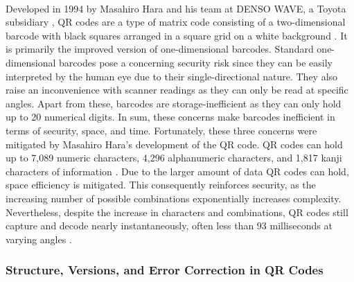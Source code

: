 \documentclass[a4paper]{scl-article}
\begin{document}
\paragraph{}Developed in 1994 by Masahiro Hara and his team at DENSO WAVE, a Toyota subsidiary \cite{densoQR}, QR codes are a type of matrix code consisting of a two-dimensional barcode with black squares arranged in a square grid on a white background \cite{worldbank2021}.  It is primarily the improved version of one-dimensional barcodes. Standard one-dimensional barcodes pose a concerning security risk since they can be easily interpreted by the human eye due to their single-directional nature. They also raise an inconvenience with scanner readings as they can only be read at specific angles. Apart from these, barcodes are storage-inefficient as they can only hold up to 20 numerical digits. In sum, these concerns make barcodes inefficient in terms of security, space, and time. Fortunately, these three concerns were mitigated by Masahiro Hara’s development of the QR code. QR codes can hold up to 7,089 numeric characters, 4,296 alphanumeric characters, and 1,817 kanji characters of information \cite{sankara2012}. Due to the larger amount of data QR codes can hold, space efficiency is mitigated. This consequently reinforces security, as the increasing number of possible combinations exponentially increases complexity. Nevertheless, despite the increase in characters and combinations, QR codes still capture and decode nearly instantaneously, often less than 93 milliseconds at varying angles \cite{corpuz2025}. 

\subsubsection{Structure, Versions, and Error Correction in QR Codes}
\label{sect:rrl_1b}
\end{document}
